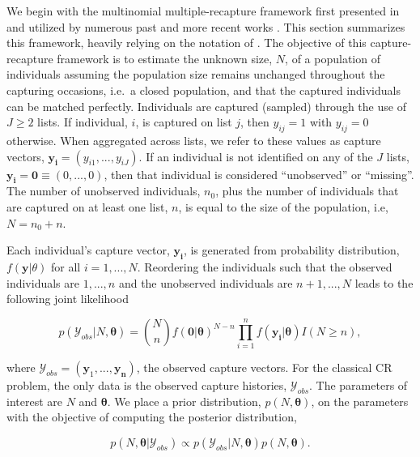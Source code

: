 \documentclass[
  12pt,
]{article}
\begin{document}
We begin with the multinomial multiple-recapture framework first
presented in \cite{darroch_multiple-recapture_1958} and utilized by
numerous past and more recent works \citep{sandland_statistical_1984}.
This section summarizes this framework, heavily relying on the notation
of \cite{manriquevallier_bayesian_2016}. The objective of this
capture-recapture framework is to estimate the unknown size, \(N\), of a
population of individuals assuming the population size remains unchanged
throughout the capturing occasions, i.e.~a closed population, and that
the captured individuals can be matched perfectly. Individuals are
captured (sampled) through the use of \(J\ge 2\) lists. If individual,
\(i\), is captured on list \(j\), then \(y_{ij}=1\) with \(y_{ij}=0\)
otherwise. When aggregated across lists, we refer to these values as
capture vectors, \(\boldsymbol{y_i} = (y_{i1},...,y_{iJ})\). If an
individual is not identified on any of the \(J\) lists,
\(\boldsymbol{y_i} = \textbf{0} \equiv (0,...,0)\), then that individual
is considered ``unobserved'' or ``missing''. The number of unobserved
individuals, \(n_0\), plus the number of individuals that are captured
on at least one list, \(n\), is equal to the size of the population,
i.e, \(N = n_0 + n\).

Each individual's capture vector, \(\boldsymbol{y_i}\), is generated
from probability distribution, \(f(\boldsymbol{y}|\theta)\) for all
\(i = 1,...,N\). Reordering the individuals such that the observed
individuals are \(1,...,n\) and the unobserved individuals are
\(n+1,...,N\) leads to the following joint likelihood

\begin{equation}
\label{eqn:jointlikelihoodequation1}
p(\mathcal{Y}_{obs}|N,\boldsymbol{\theta})=\binom{N}{n} f(\boldsymbol{0}|\boldsymbol{\theta})^{N-n}\prod_{i=1}^n f(\boldsymbol{y_i}|\boldsymbol{\theta})I(N\ge n),
\end{equation}

where \(\mathcal{Y}_{obs} = (\boldsymbol{y}_1,...,\boldsymbol{y_n})\),
the observed capture vectors. For the classical CR problem, the only
data is the observed capture histories, \(\mathcal{Y}_{obs}\). The
parameters of interest are \(N\) and \(\boldsymbol{\theta}\). We place a
prior distribution, \(p(N,\boldsymbol{\theta})\), on the parameters with
the objective of computing the posterior distribution,

\begin{equation}
\label{eqn:simpleposteriorclassical}
p(N,\boldsymbol{\theta}|\mathcal{Y}_{obs}) \propto p(\mathcal{Y}_{obs}|N,\boldsymbol{\theta})p(N,\boldsymbol{\theta}).
\end{equation}
\end{document}
